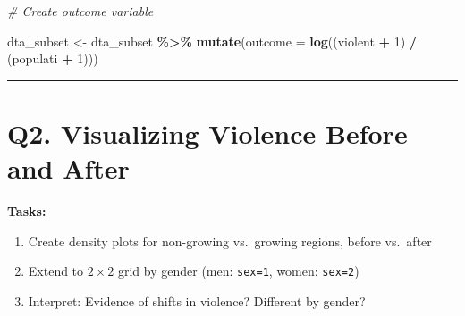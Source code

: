 \documentclass[
]{article}
\newenvironment{Shaded}{\begin{snugshade}}{\end{snugshade}}
\newcommand{\AttributeTok}[1]{\textcolor[rgb]{0.13,0.29,0.53}{#1}}
\newcommand{\CommentTok}[1]{\textcolor[rgb]{0.56,0.35,0.01}{\textit{#1}}}
\newcommand{\DecValTok}[1]{\textcolor[rgb]{0.00,0.00,0.81}{#1}}
\newcommand{\FunctionTok}[1]{\textcolor[rgb]{0.13,0.29,0.53}{\textbf{#1}}}
\newcommand{\NormalTok}[1]{#1}
\newcommand{\OtherTok}[1]{\textcolor[rgb]{0.56,0.35,0.01}{#1}}
\newcommand{\SpecialCharTok}[1]{\textcolor[rgb]{0.81,0.36,0.00}{\textbf{#1}}}
\providecommand{\tightlist}{%
  \setlength{\itemsep}{0pt}\setlength{\parskip}{0pt}}
\begin{document}
\begin{Shaded}
\begin{Highlighting}[]
\CommentTok{\# Create outcome variable}

\NormalTok{dta\_subset }\OtherTok{\textless{}{-}}\NormalTok{ dta\_subset }\SpecialCharTok{\%\textgreater{}\%} 
  \FunctionTok{mutate}\NormalTok{(}\AttributeTok{outcome =} \FunctionTok{log}\NormalTok{((violent }\SpecialCharTok{+} \DecValTok{1}\NormalTok{) }\SpecialCharTok{/}\NormalTok{ (populati }\SpecialCharTok{+} \DecValTok{1}\NormalTok{)))}
\end{Highlighting}
\end{Shaded}

\begin{center}\rule{0.5\linewidth}{0.5pt}\end{center}

\section{Q2. Visualizing Violence Before and
After}\label{q2.-visualizing-violence-before-and-after}

\textbf{Tasks:}

\begin{enumerate}
\def\labelenumi{\arabic{enumi}.}
\tightlist
\item
  Create density plots for non-growing vs.~growing regions, before
  vs.~after
\item
  Extend to \(2 \times 2\) grid by gender (men: \texttt{sex=1}, women:
  \texttt{sex=2})
\item
  Interpret: Evidence of shifts in violence? Different by gender?
\end{enumerate}
\end{document}
